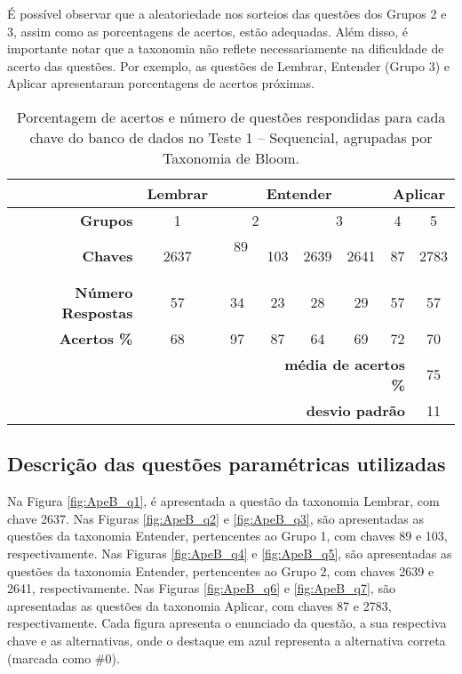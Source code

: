 É possível observar que a aleatoriedade nos sorteios das questões dos Grupos 2 e 3, assim como as porcentagens de acertos, estão adequadas. Além disso, é importante notar que a taxonomia não reflete necessariamente na dificuldade de acerto das questões. Por exemplo, as questões de Lembrar, Entender (Grupo 3) e Aplicar apresentaram porcentagens de acertos próximas.

\begin{table}[htbp]
    \centering
    \caption{Porcentagem de acertos e número de questões respondidas para cada chave do banco de dados no Teste 1 -- Sequencial, agrupadas por Taxonomia de Bloom.}
    \label{tab:respostas_atualizada}
    \begin{tabular}{|r|c|c|c|c|c|c|c|}
        \hline
         & \multicolumn{1}{c|}{\cellcolor{green!25}\textbf{Lembrar}} & \multicolumn{4}{c|}{\cellcolor{yellow!25}\textbf{Entender}} & \multicolumn{2}{c|}{\cellcolor{red!25}\textbf{Aplicar}} \\ \hline
        \textbf{Grupos} & 1 & \multicolumn{2}{c|}{2} & \multicolumn{2}{c|}{3} & 4 & 5 \\
        \hline \rowcolor[HTML]{D9D9D9} 
        \textbf{Chaves} & 2637 & \ 89 \ & 103 & 2639 & 2641 & 87 & 2783 \\
        \textbf{Número Respostas} & 57 & 34 & 23 & 28 & 29 & 57 & 57 \\\rowcolor[HTML]{D9D9D9} 
        \textbf{Acertos \%} & 68 & 97 & 87 & 64 & 69 & 72 & 70 \\
        \hline
        \multicolumn{3}{r}{} & \multicolumn{4}{r}{\cellcolor[HTML]{F9CB9C}\textbf{média de acertos \%}} & \multicolumn{1}{c}{\cellcolor[HTML]{F9CB9C}75} \\ 
        \multicolumn{3}{r}{} & \multicolumn{4}{r}{\cellcolor[HTML]{F9CB9C}\textbf{desvio padrão}} & \multicolumn{1}{c}{\cellcolor[HTML]{F9CB9C}11} \\ 
    \end{tabular}
\end{table}

\subsection{Descrição das questões paramétricas utilizadas}\label{sec:questoesTeste1}

Na Figura \ref{fig:ApeB_q1}, é apresentada a questão da taxonomia Lembrar, com chave 2637. Nas Figuras \ref{fig:ApeB_q2} e \ref{fig:ApeB_q3}, são apresentadas as questões da taxonomia Entender, pertencentes ao Grupo 1, com chaves 89 e 103, respectivamente. Nas Figuras \ref{fig:ApeB_q4} e \ref{fig:ApeB_q5}, são apresentadas as questões da taxonomia Entender, pertencentes ao Grupo 2, com chaves 2639 e 2641, respectivamente. Nas Figuras \ref{fig:ApeB_q6} e \ref{fig:ApeB_q7}, são apresentadas as questões da taxonomia Aplicar, com chaves 87 e 2783, respectivamente. Cada figura apresenta o enunciado da questão, a sua respectiva chave e as alternativas, onde o destaque em azul representa a alternativa correta (marcada como \#0). 

